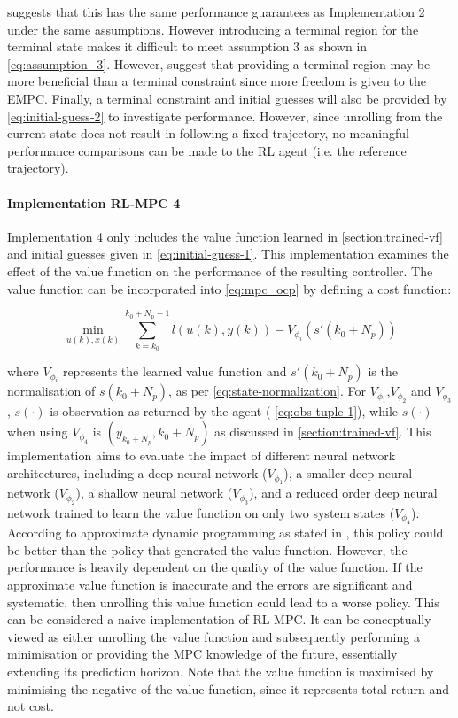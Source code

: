 \cite{amritEconomicOptimizationUsing2011} suggests that this has the same performance guarantees as Implementation 2 under the same assumptions. However introducing a terminal region for the terminal state makes it difficult to meet assumption 3 as shown in \autoref{eq:assumption_3}. However, \cite{amritEconomicOptimizationUsing2011} suggest that providing a terminal region may be more beneficial than a terminal constraint since more freedom is given to the EMPC. Finally, a terminal constraint and initial guesses will also be provided by \autoref{eq:initial-guess-2} to investigate performance. However, since unrolling from the current state does not result in following a fixed trajectory, no meaningful performance comparisons can be made to the RL agent (i.e. the reference trajectory).

\paragraph{Implementation RL-MPC 4}
Implementation 4 only includes the value function learned in \autoref{section:trained-vf} and initial guesses given in \autoref{eq:initial-guess-1}. This implementation examines the effect of the value function on the performance of the resulting controller. The value function can be incorporated into \autoref{eq:mpc_ocp} by defining a cost function:

\begin{equation}\label{eq:cost-function}
		\min_{u(k),x(k)}  \sum_{k = k_0}^{k_0 + N_p - 1}{l(u(k), y(k))} - V_{\phi_i}(s'(k_0 + N_p))
\end{equation}

where $V_{\phi_i}$ represents the learned value function and $s'(k_0+N_p)$ is the normalisation of $s(k_0+N_p)$, as per \autoref{eq:state-normalization}. For $V_{\phi_1}$,$V_{\phi_2}$ and $V_{\phi_3}$, $s(\cdot)$ is observation as returned by the agent ( \autoref{eq:obs-tuple-1}), while $s(\cdot)$ when using $V_{\phi_4}$ is $(y_{k_0+N_p},k_0+N_p)$ as discussed in \autoref{section:trained-vf}. This implementation aims to evaluate the impact of different neural network architectures, including a deep neural network ($V_{\phi_1}$), a smaller deep neural network ($V_{\phi_2}$), a shallow neural network ($V_{\phi_3}$), and a reduced order deep neural network trained to learn the value function on only two system states ($V_{\phi_4}$). According to approximate dynamic programming as stated in \cite{bertsekasLessonsAlphaZeroOptimal}, this policy could be better than the policy that generated the value function. However, the performance is heavily dependent on the quality of the value function. If the approximate value function is inaccurate and the errors are significant and systematic, then unrolling this value function could lead to a worse policy.  This can be considered a naive implementation of RL-MPC. It can be conceptually viewed as either unrolling the value function and subsequently performing a minimisation or providing the MPC knowledge of the future, essentially extending its prediction horizon. Note that the value function is maximised by minimising the negative of the value function, since it represents total return and not cost.

